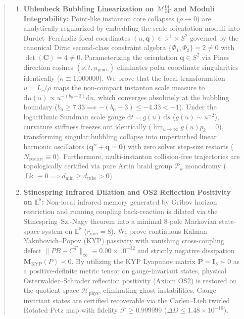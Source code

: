 \documentclass[11pt,a4paper,reqno]{article}
\theoremstyle{plain}
\theoremstyle{definition}
\theoremstyle{remark}
\numberwithin{equation}{section}
\newcommand{\Mbf}{\mathcal{M}_{\mathrm{BF}}^{14}}
\providecommand{\diff}{\mathrm{d}}
\begin{document}
\begin{abstract}
\begin{enumerate}[label=\textbf{(\roman*)}, leftmargin=2.2em]
  \item \textbf{Uhlenbeck Bubbling Linearization on $\Mbf$ and Moduli Integrability:} Point-like instanton core collapses ($\rho \to 0$) are analytically regularized by embedding the scale-orientation moduli into Burdet--Ferr\'{a}ndiz focal coordinates $(u, \mathbf{q}) \in \mathbb{R}^+ \times S^2$ governed by the canonical Dirac second-class constraint algebra $\{\Phi_1, \Phi_2\} = 2 \ne 0$ with $\det(\mathbf{C}) = 4 \ne 0$. Parameterizing the orientation $\mathbf{q} \in S^2$ via Pines direction cosines $(s, t, u_{\mathrm{pines}})$ eliminates polar coordinate singularities identically ($\kappa \equiv 1.000000$). We prove that the focal transformation $u = L_c/\rho$ maps the non-compact instanton scale measure to $\diff\mu(u) \propto u^{-(b_0-3)}\diff u$, which converges absolutely at the bubbling boundary ($b_0 \ge 7.33 \implies -(b_0-3) \le -4.33 < -1$). Under the logarithmic Sundman scale gauge $\diff t = g(u)\,\diff s$ ($g(u) \sim u^{-2}$), curvature stiffness freezes out identically ($\lim_{u \to \infty} g(u) p_k = 0$), transforming singular bubbling collapse into unperturbed linear harmonic oscillators ($\mathbf{q}'' + \mathbf{q} = \mathbf{0}$) with zero solver step-size restarts ($N_{\mathrm{restart}} \equiv 0$). Furthermore, multi-instanton collision-free trajectories are topologically certified via pure Artin braid group $\mathcal{P}_k$ monodromy ($\operatorname{Lk} \equiv 0 \implies d_{\min} \ge d_{\mathrm{tube}} > 0$).
  \item \textbf{Stinespring Infrared Dilation and OS2 Reflection Positivity on $\mathbb{E}^8$:} Non-local infrared memory generated by Gribov horizon restriction and running coupling back-reaction is dilated via the Stinespring--Sz.-Nagy theorem into a minimal 8-pole Markovian state-space system on $\mathbb{E}^8$ ($r_{\min} = 8$). We prove continuous Kalman--Yakubovich--Popov (KYP) passivity with vanishing cross-coupling defect $\|PB - C^T\|_\infty \equiv 0.00 \times 10^{-32}$ and strictly negative dissipation $\mathbf{M}_{\mathrm{KYP}}(P) \prec 0$. By utilizing the KYP Lyapunov matrix $\mathbf{P} = \mathbf{I}_8 \succ 0$ as a positive-definite metric tensor on gauge-invariant states, physical Osterwalder--Schrader reflection positivity (Axiom OS2) is restored on the quotient space $\mathcal{H}_{\mathrm{phys}}$, eliminating ghost instabilities. Gauge-invariant states are certified recoverable via the Carlen--Lieb twirled Rotated Petz map with fidelity $\mathcal{F} \ge 0.999999$ ($\Delta D \le 1.48 \times 10^{-16}$).

\end{enumerate}
\end{abstract}
\end{document}
